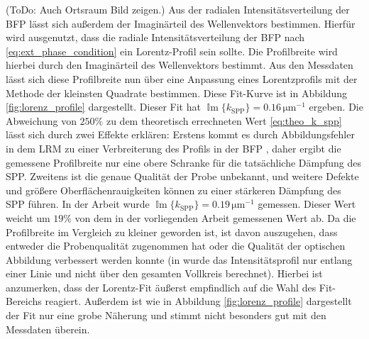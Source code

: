 \documentclass[titlepage,  ngerman]{article}
\renewcommand{\Im}{\operatorname{\mathbb{I}m}}
\begin{document}
	(ToDo: Auch Ortsraum Bild zeigen.)
	Aus der radialen Intensitätsverteilung der BFP lässt sich außerdem der Imaginärteil des Wellenvektors bestimmen. Hierfür  wird ausgenutzt, dass die radiale Intensitätsverteilung der BFP nach \eqref{eq:ext_phase_condition} ein Lorentz-Profil sein sollte. Die Profilbreite wird hierbei durch den Imaginärteil des Wellenvektors bestimmt. Aus den Messdaten lässt sich diese Profilbreite nun über eine Anpassung eines Lorentzprofils mit der Methode der kleinsten Quadrate bestimmen. Diese Fit-Kurve ist in Abbildung \ref{fig:lorenz_profile} dargestellt. Dieser Fit hat $\Im\{k_\mathrm{SPP}\} = 0.16\,\mathrm{\mu m}^{-1}$ ergeben. Die Abweichung von $250\%$ zu dem theoretisch errechneten Wert \ref{eq:theo_k_spp} lässt sich durch zwei Effekte erklären: Erstens kommt es durch Abbildungsfehler in dem LRM zu einer Verbreiterung des Profils in der BFP \cite{Jaruschewski.2020}, daher ergibt die gemessene Profilbreite nur eine obere Schranke für die tatsächliche Dämpfung des SPP. Zweitens ist die genaue Qualität der Probe unbekannt, und weitere Defekte und größere Oberflächenrauigkeiten können zu einer stärkeren Dämpfung des SPP führen. In der Arbeit \cite{Jaruschewski.2020} wurde  $\Im\{k_\mathrm{SPP}\} = 0.19\,\mathrm{\mu m}^{-1}$ gemessen. Dieser Wert weicht um $19\%$ von dem in der vorliegenden Arbeit gemessenen Wert ab. Da die Profilbreite im Vergleich zu \cite{Jaruschewski.2020} kleiner geworden ist, ist davon auszugehen, dass entweder die Probenqualität zugenommen hat oder die Qualität der optischen Abbildung verbessert werden konnte (in \cite{Jaruschewski.2020} wurde das Intensitätsprofil nur entlang einer Linie und nicht über den gesamten Vollkreis berechnet). Hierbei ist anzumerken, dass der Lorentz-Fit äußerst empfindlich auf die Wahl des Fit-Bereichs reagiert. Außerdem ist wie in Abbildung \ref{fig:lorenz_profile} dargestellt der Fit nur eine grobe Näherung und stimmt nicht besonders gut mit den Messdaten überein.	
	
\end{document}
